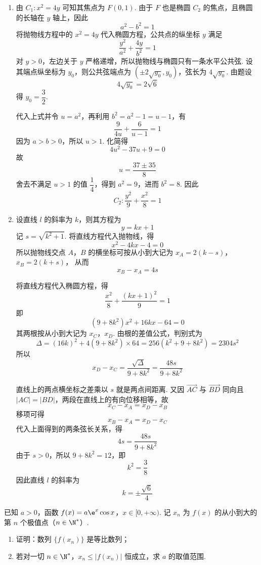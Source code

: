 \begin{solution}
\begin{enumerate}
\item 由 \(C_{1}:x^{2}=4y\) 可知其焦点为 \(F(0,1)\). 由于 \(F\) 也是椭圆 \(C_{2}\) 的焦点，且椭圆的长轴在 \(y\) 轴上，因此
\[
a^{2}-b^{2}=1
\]
将抛物线方程中的 \(x^{2}=4y\) 代入椭圆方程，公共点的纵坐标 \(y\) 满足
\[
\frac{y^{2}}{a^{2}}+\frac{4y}{b^{2}}=1
\]
对 \(y>0\)，左边关于 \(y\) 严格递增，所以抛物线与椭圆只有一条水平公共弦. 设其端点纵坐标为 \(y_{0}\)，则公共弦端点为 \((\pm2\sqrt{y_{0}},y_{0})\)，弦长为 \(4\sqrt{y_{0}}\). 由题设
\[
4\sqrt{y_{0}}=2\sqrt{6}
\]
得 \(y_{0}=\dfrac{3}{2}\).

代入上式并令 \(u=a^{2}\)，再利用 \(b^{2}=a^{2}-1=u-1\)，有
\[
\frac{9}{4u}+\frac{6}{u-1}=1
\]
因为 \(a>b>0\)，所以 \(u>1\). 化简得
\[
4u^{2}-37u+9=0
\]
故
\[
u=\frac{37\pm35}{8}
\]
舍去不满足 \(u>1\) 的值 \(\dfrac14\)，得到 \(a^{2}=9\)，进而 \(b^{2}=8\). 因此
\[
C_{2}:\frac{y^{2}}{9}+\frac{x^{2}}{8}=1
\]

\item 设直线 \(l\) 的斜率为 \(k\)，则其方程为
\[
y=kx+1
\]
记 \(s=\sqrt{k^{2}+1}\). 将直线方程代入抛物线，得
\[
x^{2}-4kx-4=0
\]
所以抛物线交点 \(A\)，\(B\) 的横坐标可按从小到大记为
\(x_{A}=2(k-s)\)，\(x_{B}=2(k+s)\)，
从而
\[
x_{B}-x_{A}=4s
\]

将直线方程代入椭圆方程，得
\[
\frac{x^{2}}{8}+\frac{(kx+1)^{2}}{9}=1
\]
即
\[
(9+8k^{2})x^{2}+16kx-64=0
\]
其两根按从小到大记为 \(x_{C}\)，\(x_{D}\). 由根的差值公式，判别式为
\[
\Delta=(16k)^{2}+4(9+8k^{2})\times64
 =256\left(k^{2}+9+8k^{2}\right)
 =2304s^{2}
\]
所以
\[
x_{D}-x_{C}=\frac{\sqrt{\Delta}}{9+8k^{2}}
 =\frac{48s}{9+8k^{2}}
\]

直线上的两点横坐标之差乘以 \(s\) 就是两点间距离. 又因 \(\overrightarrow{AC}\) 与 \(\overrightarrow{BD}\) 同向且 \(\left|AC\right|=\left|BD\right|\)，两段在直线上的有向位移相等，故
\[
x_{C}-x_{A}=x_{D}-x_{B}
\]
移项可得
\[
x_{B}-x_{A}=x_{D}-x_{C}
\]
代入上面得到的两条弦长关系，得
\[
4s=\frac{48s}{9+8k^{2}}
\]
由于 \(s>0\)，所以 \(9+8k^{2}=12\)，即
\[
k^{2}=\frac{3}{8}
\]
因此直线 \(l\) 的斜率为
\[
k=\pm\frac{\sqrt{6}}{4}
\]
\end{enumerate}
\end{solution}

\begin{problem}
已知 \(a > 0\)，函数 \(f(x) = a\e^{x}\cos x\)，\(x \in [0, +\infty)\). 记 \(x_n\) 为 \(f(x)\) 的从小到大的第 \(n\) 个极值点（\(n \in \N^*\)）.
\begin{enumerate}
\item 证明：数列 \( \{f(x_{n})\} \) 是等比数列；
\item 若对一切 \(n \in \N^*\)，\(x_n \leqslant |f(x_n)|\) 恒成立，求 \(a\) 的取值范围.
\end{enumerate}
\end{problem}

